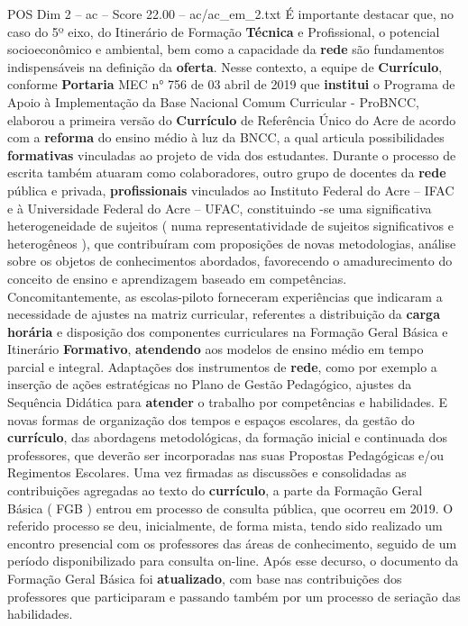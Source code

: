 \begin{textsample}{POS Dim 2 – ac – Score 22.00 – ac/ac\_em\_2.txt}
É importante destacar que, no caso do 5º eixo, do Itinerário de Formação \textbf{Técnica} e Profissional, o potencial socioeconômico e ambiental, bem como a capacidade da \textbf{rede} são fundamentos indispensáveis na definição da \textbf{oferta}.
Nesse contexto, a equipe de \textbf{Currículo}, conforme \textbf{Portaria} MEC n{\EmojiFont °} 756 de 03 abril de 2019 que \textbf{institui} o Programa de Apoio à Implementação da Base Nacional Comum Curricular - ProBNCC, elaborou a primeira versão do \textbf{Currículo} de Referência Único do Acre de acordo com a \textbf{reforma} do ensino médio à luz da BNCC, a qual articula possibilidades \textbf{formativas} vinculadas ao projeto de vida dos estudantes.
Durante o processo de escrita também atuaram como colaboradores, outro grupo de docentes da \textbf{rede} pública e privada, \textbf{profissionais} vinculados ao Instituto Federal do Acre – IFAC e à Universidade Federal do Acre – UFAC, constituindo -se uma significativa heterogeneidade de sujeitos ( numa representatividade de sujeitos significativos e heterogêneos ), que contribuíram com proposições de novas metodologias, análise sobre os objetos de conhecimentos abordados, favorecendo o amadurecimento do conceito de ensino e aprendizagem baseado em competências.
Concomitantemente, as escolas-piloto forneceram experiências que indicaram a necessidade de ajustes na matriz curricular, referentes a distribuição da \textbf{carga} \textbf{horária} e disposição dos componentes curriculares na Formação Geral Básica e Itinerário \textbf{Formativo}, \textbf{atendendo} aos modelos de ensino médio em tempo parcial e integral.
Adaptações dos instrumentos de \textbf{rede}, como por exemplo a inserção de ações estratégicas no Plano de Gestão Pedagógico, ajustes da Sequência Didática para \textbf{atender} o trabalho por competências e habilidades.
E novas formas de organização dos tempos e espaços escolares, da gestão do \textbf{currículo}, das abordagens metodológicas, da formação inicial e continuada dos professores, que deverão ser incorporadas nas suas Propostas Pedagógicas e/ou Regimentos Escolares.
Uma vez firmadas as discussões e consolidadas as contribuições agregadas ao texto do \textbf{currículo}, a parte da Formação Geral Básica ( FGB ) entrou em processo de consulta pública, que ocorreu em 2019.
O referido processo se deu, inicialmente, de forma mista, tendo sido realizado um encontro presencial com os professores das áreas de conhecimento, seguido de um período disponibilizado para consulta on-line.
Após esse decurso, o documento da Formação Geral Básica foi \textbf{atualizado}, com base nas contribuições dos professores que participaram e passando também por um processo de seriação das habilidades.

\end{textsample}
